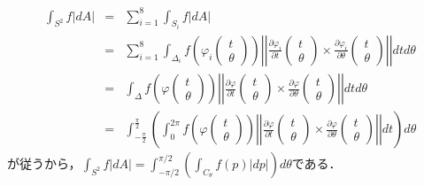 \documentclass[dvipdfmx,nosetpagesize, uplatex]{jsarticle}
\theoremstyle{definition}
\theoremstyle{StatementsWithStar}
\theoremstyle{StatementsWithStar2}
\theoremstyle{StatementsWithStar3}
\theoremstyle{StatementsWithCCirc}
\theoremstyle{definition}
\begin{document}
\begin{eqnarray*}
    \int_{S^2}f|dA| &=& \sum^8_{i=1}\int_{S_i}f|dA| \\
    &=& \sum^8_{i=1}\int_{\Delta_i}f\left(\varphi_i\left(\begin{array}{l}t \\\theta \end{array}\right)\right)\left|\left| \frac{\partial \varphi_i}{\partial t}\left(\begin{array}{c}t \\\theta \end{array}\right)\times \frac{\partial \varphi_i}{\partial \theta}\left(\begin{array}{c}t \\\theta \end{array}\right) \right|\right|dtd\theta \\
    &=& \int_\Delta f\left(\varphi\left(\begin{array}{c}t \\\theta \end{array}\right)\right)\left|\left| \frac{\partial \varphi}{\partial t}\left(\begin{array}{c}t \\\theta \end{array}\right)\times \frac{\partial \varphi}{\partial \theta}\left(\begin{array}{c}t \\\theta \end{array}\right) \right|\right|dtd\theta \\
    &=& \int^{\frac{\pi}{2}}_{-\frac{\pi}{2}} \left( \int^{2\pi}_0 f\left(\varphi\left(\begin{array}{c}t \\\theta \end{array}\right)\right) \left|\left| \frac{\partial \varphi}{\partial t}\left(\begin{array}{c}t \\\theta \end{array}\right)\times \frac{\partial \varphi}{\partial \theta}\left(\begin{array}{c}t \\\theta \end{array}\right) \right|\right|dt \right) d\theta
\end{eqnarray*}
が従うから，$\int_{S^2}f|dA|=\int_{-\pi/2}^{\pi/2}\left(\int_{C_\theta}f(p)\lvert dp\rvert\right)d\theta$である．
\end{document}
